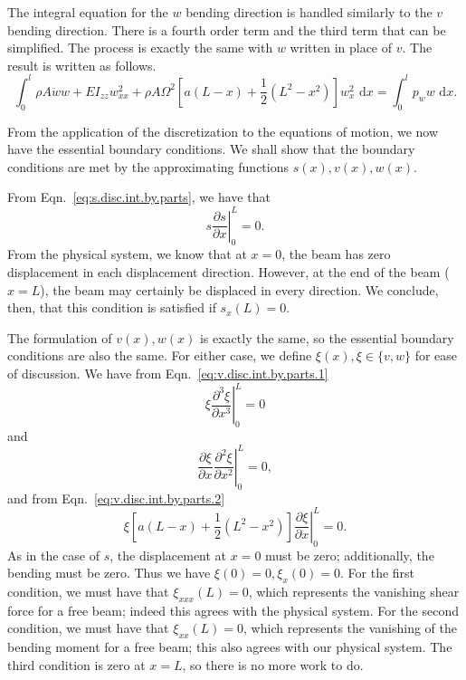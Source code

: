 The integral equation for the $w$ bending direction is handled similarly to the $v$ bending direction. There is a fourth order term and the third term that can be simplified. The process is exactly the same with $w$ written in place of $v$. The result is written as follows.
\begin{equation}
\int_0^l\rho A\ddot ww+EI_{zz}w_{xx}^2+\rho A\Omega^2\left[a(L-x)+\frac{1}{2}(L^2-x^2)\right]w_x^2\text{ d}x = \int_0^lp_ww\text{ d}x. 
\label{eq:w.bending.integral.eqn}
\end{equation}

From the application of the discretization to the equations of motion, we now have the essential boundary conditions. We shall show that the boundary conditions are met by the approximating functions $s(x), v(x), w(x)$.

From Eqn.~\ref{eq:s.disc.int.by.parts}, we have that 
\begin{equation}
\left.s\frac{\partial s}{\partial x}\right|_0^L = 0.
\end{equation}
From the physical system, we know that at $x=0$, the beam has zero displacement in each displacement direction. However, at the end of the beam ($x=L$), the beam may certainly be displaced in every direction. We conclude, then, that this condition is satisfied if $s_x(L) = 0$. 

The formulation of $v(x),w(x)$ is exactly the same, so the essential boundary conditions are also the same. For either case, we define $\xi(x), \xi\in\{v,w\}$ for ease of discussion. We have from Eqn.~\ref{eq:v.disc.int.by.parts.1}
\begin{equation}
\left.\xi\frac{\partial^3 \xi}{\partial x^3}\right|_0^L = 0
\end{equation}
and  
\begin{equation}
\left.\frac{\partial \xi}{\partial x}\frac{\partial^2 \xi}{\partial x^2}\right|_0^L = 0,
\end{equation}
and from Eqn.~\ref{eq:v.disc.int.by.parts.2}
\begin{equation}
\left.\xi\left[a(L-x)+\frac{1}{2}(L^2-x^2)\right]\frac{\partial \xi}{\partial x}\right|_0^L = 0.
\end{equation}
As in the case of $s$, the displacement at $x=0$ must be zero; additionally, the bending must be zero. Thus we have $\xi(0)=0,\xi_x(0)=0$. For the first condition, we must have that $\xi_{xxx}(L) = 0$, which represents the vanishing shear force for a free beam; indeed this agrees with the physical system. For the second condition, we must have that $\xi_{xx}(L) = 0$, which represents the vanishing of the bending moment for a free beam; this also agrees with our physical system. The third condition is zero at $x=L$, so there is no more work to do. 

